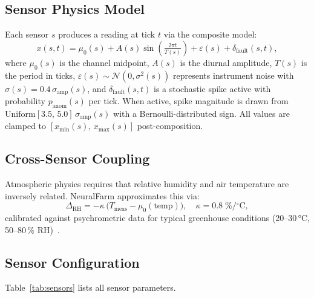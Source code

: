 \documentclass[journal,10pt,twocolumn]{IEEEtran}
\begin{document}
\subsection{Sensor Physics Model}

Each sensor $s$ produces a reading at tick $t$ via the composite model:
\begin{equation}
  x(s,t) = \mu_0(s)
    + A(s)\sin\!\left(\tfrac{2\pi t}{T(s)}\right)
    + \varepsilon(s)
    + \delta_{\mathrm{fault}}(s,t),
  \label{eq:sensor}
\end{equation}
where $\mu_0(s)$ is the channel midpoint, $A(s)$ is the diurnal
amplitude, $T(s)$ is the period in ticks,
$\varepsilon(s)\!\sim\!\mathcal{N}(0,\sigma^2(s))$ represents instrument
noise with $\sigma(s){=}0.4\,\sigma_{\mathrm{amp}}(s)$, and
$\delta_{\mathrm{fault}}(s,t)$ is a stochastic spike active with
probability $p_{\mathrm{anom}}(s)$ per tick.
When active, spike magnitude is drawn from
$\mathrm{Uniform}[3.5,\,5.0]\,\sigma_{\mathrm{amp}}(s)$ with a
Bernoulli-distributed sign.
All values are clamped to $[x_{\min}(s),\,x_{\max}(s)]$ post-composition.

\subsection{Cross-Sensor Coupling}

Atmospheric physics requires that relative humidity and air temperature
are inversely related. NeuralFarm approximates this via:
\begin{equation}
  \Delta_{\mathrm{RH}} = -\kappa\,
    \bigl(T_{\mathrm{meas}} - \mu_0(\mathrm{temp})\bigr),
  \quad \kappa = 0.8\;\%/\!{^\circ}\mathrm{C},
  \label{eq:coupling}
\end{equation}
calibrated against psychrometric data for typical greenhouse conditions
(20--30\,°C, 50--80\,\% RH)~\cite{Savvas2007}.

\subsection{Sensor Configuration}

Table~\ref{tab:sensors} lists all sensor parameters.
\end{document}

